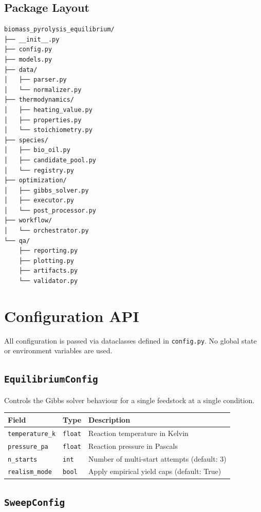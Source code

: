 \documentclass[12pt, a4paper]{article}
\begin{document}
\subsection{Package Layout}

\begin{verbatim}
biomass_pyrolysis_equilibrium/
├── __init__.py
├── config.py
├── models.py
├── data/
│   ├── parser.py
│   └── normalizer.py
├── thermodynamics/
│   ├── heating_value.py
│   ├── properties.py
│   └── stoichiometry.py
├── species/
│   ├── bio_oil.py
│   ├── candidate_pool.py
│   └── registry.py
├── optimization/
│   ├── gibbs_solver.py
│   ├── executor.py
│   └── post_processor.py
├── workflow/
│   └── orchestrator.py
└── qa/
    ├── reporting.py
    ├── plotting.py
    ├── artifacts.py
    └── validator.py
\end{verbatim}

\section{Configuration API}

All configuration is passed via dataclasses defined in \texttt{config.py}. No global state or environment variables are used.

\subsection{\texttt{EquilibriumConfig}}

Controls the Gibbs solver behaviour for a single feedstock at a single condition.

\begin{longtable}{lll}
\toprule
\textbf{Field} & \textbf{Type} & \textbf{Description} \\
\midrule
\texttt{temperature\_k} & \texttt{float} & Reaction temperature in Kelvin \\
\texttt{pressure\_pa} & \texttt{float} & Reaction pressure in Pascals \\
\texttt{n\_starts} & \texttt{int} & Number of multi-start attempts (default: 3) \\
\texttt{realism\_mode} & \texttt{bool} & Apply empirical yield caps (default: True) \\
\bottomrule
\end{longtable}

\subsection{\texttt{SweepConfig}}
\end{document}
